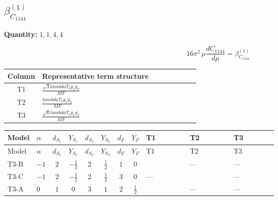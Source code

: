 \documentclass[8pt]{article}
\begin{document}
\begin{landscape}
\section*{$\beta_{C_{1144}}^{(1)}$}
\noindent\textbf{Quantity: }$\mathrm{1,1,4,4}$\par\smallskip
\[16\pi^2\,\mu\frac{d C_{1144}}{d\mu}=\beta_{C_{1144}}^{(1)}\]
\begin{center}
\begin{tabular}{@{}c >{\raggedright\arraybackslash}p{0.82\linewidth}@{}}
\toprule
Column & Representative term structure \\
\midrule
T1 & \(\displaystyle \frac{\sqrt{3} lambdaT_{3} \overline{y_{1}} \overline{y_{2}}}{MF}\) \\
\midrule
T2 & \(\displaystyle \frac{lambdaT_{3} \overline{y_{1}} \overline{y_{2}}}{MF}\) \\
\midrule
T3 & \(\displaystyle \frac{\sqrt{6} lambdaT_{3} \overline{y_{1}} \overline{y_{2}}}{MF}\) \\
\midrule
\bottomrule
\end{tabular}
\end{center}
\smallskip
\tiny
\begin{longtable}{@{}llcccccc >{\raggedright\arraybackslash}p{0.21\linewidth} >{\raggedright\arraybackslash}p{0.21\linewidth} >{\raggedright\arraybackslash}p{0.21\linewidth}@{}}
\toprule
Model & $\alpha$ & $d_{S_1}$ & $Y_{S_1}$ & $d_{S_2}$ & $Y_{S_2}$ & $d_F$ & $Y_F$ & T1 & T2 & T3 \\
\midrule
\endfirsthead
\toprule
Model & $\alpha$ & $d_{S_1}$ & $Y_{S_1}$ & $d_{S_2}$ & $Y_{S_2}$ & $d_F$ & $Y_F$ & T1 & T2 & T3 \\
\midrule
\endhead
T3-B & $-1$ & $2$ & $-\frac{1}{2}$ & $2$ & $\frac{1}{2}$ & $1$ & $0$ & \scriptsize\adjustbox{max width=\linewidth}{$\begin{gathered} - \frac{2 \sqrt{3} lambdaT_{3} \overline{y_{1}} \overline{y_{2}}}{3 MF}\end{gathered}$} & --- & --- \\
\midrule
T3-C & $-1$ & $2$ & $-\frac{1}{2}$ & $2$ & $\frac{1}{2}$ & $3$ & $0$ & --- & \scriptsize\adjustbox{max width=\linewidth}{$\begin{gathered} \frac{2 lambdaT_{3} \overline{y_{1}} \overline{y_{2}}}{3 MF}\end{gathered}$} & --- \\
\midrule
T3-A & $0$ & $1$ & $0$ & $3$ & $1$ & $2$ & $\frac{1}{2}$ & \scriptsize\adjustbox{max width=\linewidth}{$\begin{gathered} - \frac{2 \sqrt{3} lambdaT_{3} \overline{y_{1}} \overline{y_{2}}}{3 MF}\end{gathered}$} & --- & --- \\

\end{longtable}
\end{landscape}
\end{document}
